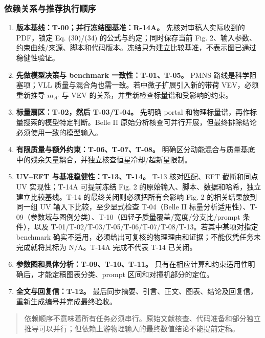 \documentclass[
]{article}
\providecommand{\tightlist}{%
  \setlength{\itemsep}{0pt}\setlength{\parskip}{0pt}}
\begin{document}
\subsubsection{依赖关系与推荐执行顺序}\label{ux4f9dux8d56ux5173ux7cfbux4e0eux63a8ux8350ux6267ux884cux987aux5e8f}

\begin{enumerate}
\def\labelenumi{\arabic{enumi}.}
\tightlist
\item
  \textbf{版本基线：T-00；并行冻结图基准：R-14A。}
  先核对审稿人实际收到的 PDF，锁定 Eq. (30)/(34)
  的公式与约定；同时保存当前 Fig.
  2、输入参数、约束曲线/来源、脚本和代码版本。冻结只为建立比较基准，不表示图已通过稳健性验证。
\item
  \textbf{先做模型决策与 benchmark 一致性：T-01、T-05。} PMNS
  路线是科学阻塞项；VLL 质量与混合角也需一致。若中微子扩展引入新的带荷
  VEV，必须重新推导 \(m_{A'}\) 与 VEV
  的关系，并重新检查标量谱和受影响的约束。
\item
  \textbf{标量扇区：T-02，然后 T-03/T-04。} 先明确 portal
  和物理标量谱，再作标量搜索的模型特定判断。Belle II
  原始分析核查可并行开展，但最终排除结论必须使用一致的模型输入。
\item
  \textbf{有限质量与额外约束：T-06、T-07、T-08。}
  明确区分动能混合与质量基底中的残余矢量耦合，并独立核查恒星冷却/超新星限制。
\item
  \textbf{UV--EFT 与基准稳健性：T-13、T-14。} T-13 核对匹配、EFT
  截断和同点 UV 实现性；T-14A 可提前冻结 Fig. 2
  的原始输入、脚本、数据和哈希，独立建立比较基线。T-14
  的最终关闭则必须把所有会影响 Fig. 2 的相关结果放到同一组 UV
  输入下比较，至少显式检查 T-04（Belle II
  标量分析适用性）、T-09（参数域与图例分类）、T-10（四轻子质量覆盖/宽度/分支比/prompt
  条件），以及 T-01/T-02/T-03/T-05/T-06/T-07/T-08/T-13。若其中某项对指定
  benchmark
  确实不适用，必须给出可复核的物理理由和证据；不能仅凭任务未完成就将其标为
  N/A。T-14A 完成不代表 T-14 已关闭。
\item
  \textbf{参数图和具体分析：T-09、T-10、T-11。}
  只有在相应计算和约束适用性明确后，才能定稿图表分类、prompt
  区间和对撞机部分的定位。
\item
  \textbf{全文与回复信：T-12。}
  最后同步摘要、引言、正文、图表、结论及回复信，重新生成编号并完成最终验收。
\end{enumerate}

\begin{quote}
依赖顺序不意味着所有任务必须串行。原始文献核查、代码准备和部分独立推导可以并行；但依赖上游物理输入的最终数值结论不能提前定稿。
\end{quote}
\end{document}
